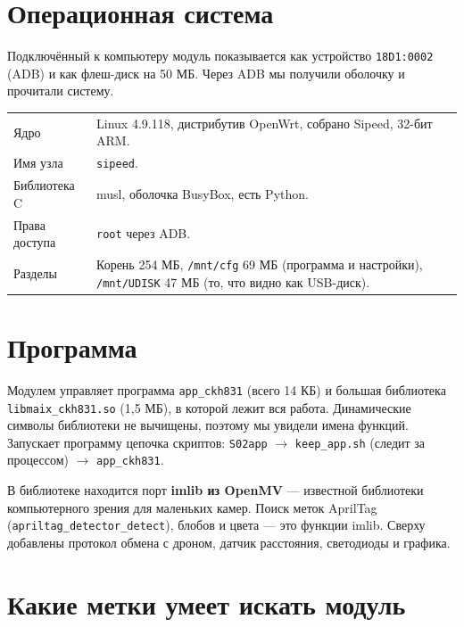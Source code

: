 \section{Операционная система}

Подключённый к компьютеру модуль показывается как устройство \texttt{18D1:0002} (ADB) и как флеш-диск на 50 МБ. Через ADB мы получили оболочку и прочитали систему.

\begin{tabularx}{\textwidth}{@{}p{3.6cm} Y@{}}
\toprule
{} &  \\ \midrule
Ядро & Linux 4.9.118, дистрибутив OpenWrt, собрано Sipeed, 32-бит ARM. \pr{} \\
Имя узла & \texttt{sipeed}. \pr{} \\
Библиотека C & musl, оболочка BusyBox, есть Python. \pr{} \\
Права доступа & \texttt{root} через ADB. \pr{} \\
Разделы & Корень 254 МБ, \texttt{/mnt/cfg} 69 МБ (программа и настройки), \texttt{/mnt/UDISK} 47 МБ (то, что видно как USB-диск). \pr{} \\ \bottomrule
\end{tabularx}

\section{Программа}

Модулем управляет программа \texttt{app\_ckh831} (всего 14 КБ) и большая библиотека \texttt{libmaix\_ckh831.so} (1,5 МБ), в которой лежит вся работа. Динамические символы библиотеки не вычищены, поэтому мы увидели имена функций. Запускает программу цепочка скриптов: \texttt{S02app} $\to$ \texttt{keep\_app.sh} (следит за процессом) $\to$ \texttt{app\_ckh831}. \pr{}

\begin{zametka}
В библиотеке находится порт \textbf{imlib из OpenMV} --- известной библиотеки компьютерного зрения для маленьких камер. Поиск меток AprilTag (\texttt{apriltag\_detector\_detect}), блобов и цвета --- это функции imlib. Сверху добавлены протокол обмена с дроном, датчик расстояния, светодиоды и графика. \pr{}
\end{zametka}

\section{Какие метки умеет искать модуль}

